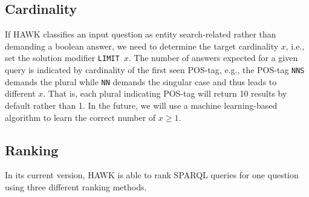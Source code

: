 \subsection{Cardinality}
If HAWK classifies an input question as entity search-related rather than demanding a boolean answer, we need to determine the target cardinality $x$, i.e., set the solution modifier \texttt{LIMIT $x$}. 
The number of answers expected for a given query is indicated by cardinality of the first seen POS-tag, e.g., the POS-tag \texttt{NNS} demands the plural while \texttt{NN} demands the singular case and thus leads to different $x$.
That is, each plural indicating POS-tag will return 10 results by default rather than 1. 
In the future, we will use a machine learning-based algorithm to learn the correct number of $x \geq 1$.

\subsection{Ranking}

In its current version, HAWK is able to rank SPARQL queries for one question using three different ranking methods.

